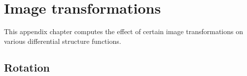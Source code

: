 \documentclass[thesis.tex]{subfiles}
\begin{document}
%
\chapter{Image transformations} \label{apx:image_transformations}

This appendix chapter computes the effect of certain image transformations on various differential structure functions.

\section{Rotation} \label{apx:rotation}
\end{document}
